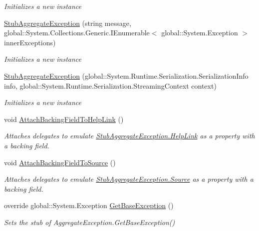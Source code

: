 \begin{DoxyCompactItemize}
\begin{DoxyCompactList}\small\item\em Initializes a new instance\end{DoxyCompactList}\item 
\hyperlink{class_system_1_1_fakes_1_1_stub_aggregate_exception_a2afb8eb2ceeb5a2183d33e318d1ac78f}{Stub\-Aggregate\-Exception} (string message, global\-::\-System.\-Collections.\-Generic.\-I\-Enumerable$<$ global\-::\-System.\-Exception $>$ inner\-Exceptions)
\begin{DoxyCompactList}\small\item\em Initializes a new instance\end{DoxyCompactList}\item 
\hyperlink{class_system_1_1_fakes_1_1_stub_aggregate_exception_a650e889e61bd61a514bfd5a746156c99}{Stub\-Aggregate\-Exception} (global\-::\-System.\-Runtime.\-Serialization.\-Serialization\-Info info, global\-::\-System.\-Runtime.\-Serialization.\-Streaming\-Context context)
\begin{DoxyCompactList}\small\item\em Initializes a new instance\end{DoxyCompactList}\item 
void \hyperlink{class_system_1_1_fakes_1_1_stub_aggregate_exception_ac1ba90dc590581ed3a5e7f8f806ccd10}{Attach\-Backing\-Field\-To\-Help\-Link} ()
\begin{DoxyCompactList}\small\item\em Attaches delegates to emulate \hyperlink{class_system_1_1_fakes_1_1_stub_aggregate_exception_ae30757b172df4b2f22c3b92ca77ac4d1}{Stub\-Aggregate\-Exception.\-Help\-Link} as a property with a backing field.\end{DoxyCompactList}\item 
void \hyperlink{class_system_1_1_fakes_1_1_stub_aggregate_exception_aaed049476865aa9672aa6a1b05039615}{Attach\-Backing\-Field\-To\-Source} ()
\begin{DoxyCompactList}\small\item\em Attaches delegates to emulate \hyperlink{class_system_1_1_fakes_1_1_stub_aggregate_exception_abd6a7539a19075e0aac3415a38617bc0}{Stub\-Aggregate\-Exception.\-Source} as a property with a backing field.\end{DoxyCompactList}\item 
override global\-::\-System.\-Exception \hyperlink{class_system_1_1_fakes_1_1_stub_aggregate_exception_a730490c241a0956df2d2217879c65f66}{Get\-Base\-Exception} ()
\begin{DoxyCompactList}\small\item\em Sets the stub of Aggregate\-Exception.\-Get\-Base\-Exception()\end{DoxyCompactList}\item 

\end{DoxyCompactItemize}

